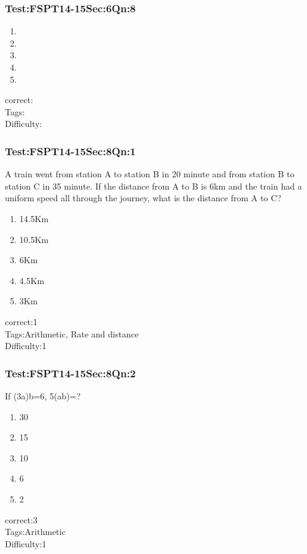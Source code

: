\documentclass[]{beamer}
\begin{document}
	\begin{frame}
	    \frametitle{Test:FSPT14-15\hspace{2mm}Sec:6\hspace{2mm}Qn:8}
	    
	    \begin{enumerate}
	        \item
	        \item
	        \item
	        \item
	        \item
	    \end{enumerate}
	    correct: \\   
	    Tags:\\
	    Difficulty:\\
    \end{frame}    
    \begin{frame}
	    \frametitle{Test:FSPT14-15\hspace{2mm}Sec:8\hspace{2mm}Qn:1}
	    A train went from station A to station B in 20 minute and from station B to station C in 35 minute. If the distance from A to B is 6km and the train had a uniform speed all through the journey, what is the distance from A to C?
	    \begin{enumerate}
	        \item
	  			14.5Km          
	        \item
	           10.5Km
	        \item
	           6Km
	        \item
	           4.5Km 
	        \item
	           3Km 
	    \end{enumerate}
	    correct:1  \\   
	    Tags:Arithmetic, Rate and distance    \\
	    Difficulty:1   \\
    \end{frame}
    \begin{frame}
	    \frametitle{Test:FSPT14-15\hspace{2mm}Sec:8\hspace{2mm}Qn:2}
	    If (3a)b=6, 5(ab)=?
	    \begin{enumerate}
	        \item
	            30
	        \item
	           	15
	        \item
	           	10
	        \item
	            6
	        \item
	            2
	    \end{enumerate}
	    correct:3  \\   
	    Tags:Arithmetic    \\
	    Difficulty:1   \\
    \end{frame}
\end{document}
